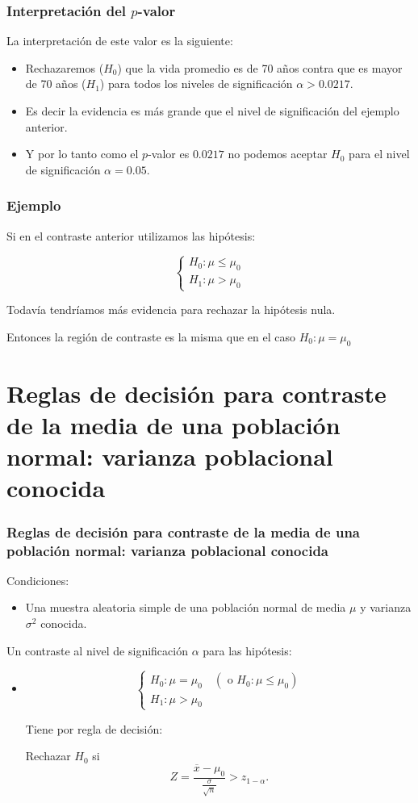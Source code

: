 \begin{frame}
\frametitle{Interpretación del $p$-valor}   
 La interpretación de este valor es la siguiente:
  \begin{itemize}
\item Rechazaremos ($H_{0}$) que la vida promedio es de 70 años contra que es
 mayor de 70 años ($H_{1}$) para todos los niveles de  significación
 $\alpha>0.0217$.
\item  Es decir la evidencia es más grande que el nivel de significación
 del ejemplo anterior.
\item Y por lo tanto  como el $p$-valor es $0.0217$ no podemos aceptar $H_0$  para el nivel de significación $\alpha=0.05$.
\end{itemize}
\end{frame}

\begin{frame}
\frametitle{Ejemplo}
Si en el  contraste anterior utilizamos las hipótesis:

   $$\left\{\begin{array}{l}
    H_{0}:\mu\leq\mu_{0}\\
    H_{1}:\mu>\mu_{0}
    \end{array}\right.$$

    Todavía tendríamos más evidencia para rechazar la hipótesis nula.

    Entonces la región de contraste es la misma que en el caso
    $H_{0}:\mu=\mu_{0}$
\end{frame}

    \section{Reglas de decisión para contraste de la media de una población normal: varianza
    poblacional conocida}

\begin{frame}
\frametitle{Reglas de decisión para contraste de la media de una población normal: varianza
    poblacional conocida}
    Condiciones:
    \begin{itemize}
    \item Una muestra aleatoria simple de una población normal de media $\mu$ y
    varianza $\sigma^2$ conocida.
    \end{itemize}


    Un contraste al nivel de significación $\alpha$ para las
    hipótesis:
\begin{itemize}
\item  $$\left\{\begin{array}{l}
    H_{0}:\mu=\mu_{0} \quad (\mbox{ o } H_{0}:\mu\leq \mu_{0})\\
    H_{1}:\mu>\mu_{0}
    \end{array}\right.$$


    Tiene por regla de decisión:

    Rechazar $H_{0}$ si
    $$Z=
    \frac{\overline{x}-\mu_{0}}{\frac{\sigma}{\sqrt{n}}}>z_{1-\alpha}.$$
\end{itemize}
\end{frame}


